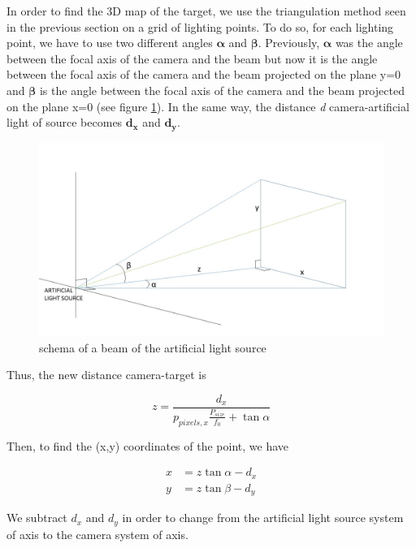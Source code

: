 In order to find the 3D map of the target, we use the triangulation method seen in the previous section on a grid of lighting points. To do so, for each lighting point, we have to use two different angles $\bm{\alpha}$ and $\bm{\beta}$. Previously, $\bm{\alpha}$ was the angle between the focal axis of the camera and the beam but now it is the angle between the focal axis of the camera and the beam projected on the plane y=0 and $\bm{\beta}$ is the angle between the focal axis of the camera and the beam projected on the plane x=0 (see figure \ref{fig:3dmap}). In the same way, the distance \emph{d} camera-artificial light of source becomes $\bm{d_x}$ and $\bm{d_y}$.

\begin{figure}[H]
  \centerline{\includegraphics[scale=0.4]{fig/3dmap.jpg}}
  \caption{schema of a beam of the artificial light source}
  \label{fig:3dmap}
\end{figure}

Thus, the new distance camera-target is

\begin{equation}
z = \frac{d_x}{p_{pixels,x}\frac{P_{size}}{f_0}+ \tan \alpha}
\label{eq:formule3D}
\end{equation}

Then, to find the (x,y) coordinates of the point, we have

\begin{align}
x & = z \tan \alpha - d_x \\
y & = z \tan \beta - d_y
\end{align}

We subtract $d_x$ and $d_y$ in order to change from the artificial light source system of axis to the camera system of axis.